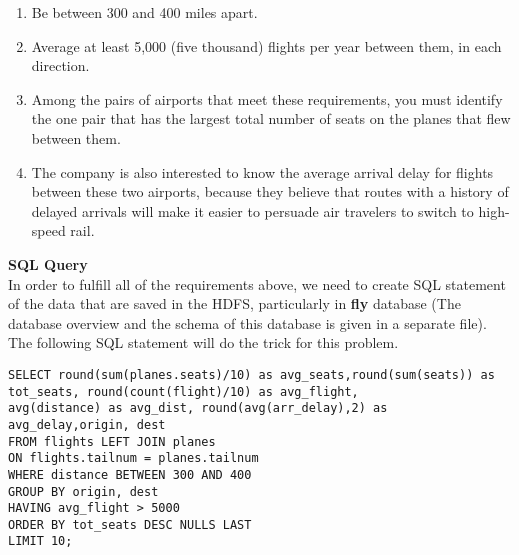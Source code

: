 \documentclass[a4paper,
							12pt,
							oneside,
							openright,
							DIV10,
							numbers=noendperiod
							]{scrreprt} %
\begin{document}
\begin{enumerate}
\item Be between 300 and 400 miles apart.
\item  Average at least 5,000 (five thousand) flights per year between them, in each direction.
\item Among the pairs of airports that meet these requirements, you must identify the one pair that has the largest total number of seats on the planes that flew between them.
\item The company is also interested to know the average arrival delay for flights between these two airports, because they believe that routes with a history of delayed arrivals will make it easier to persuade air travelers to switch to high-speed rail.\\
\end{enumerate} 

\noindent
\textbf{SQL Query}\\

\noindent
In order to fulfill all of the requirements above, we need to create SQL statement of the data that are saved in the HDFS, particularly in \textbf{fly} database (The database overview and the schema of this database is given in a separate file). The following SQL statement will do the trick for this problem.

\begin{lstlisting}
SELECT round(sum(planes.seats)/10) as avg_seats,round(sum(seats)) as tot_seats, round(count(flight)/10) as avg_flight,
avg(distance) as avg_dist, round(avg(arr_delay),2) as avg_delay,origin, dest  
FROM flights LEFT JOIN planes
ON flights.tailnum = planes.tailnum
WHERE distance BETWEEN 300 AND 400
GROUP BY origin, dest
HAVING avg_flight > 5000
ORDER BY tot_seats DESC NULLS LAST
LIMIT 10;
\end{lstlisting}
\end{document}
